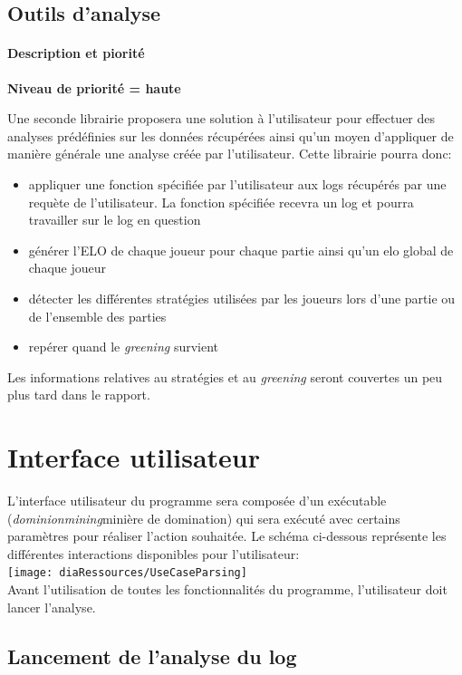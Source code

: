 \subsection{Outils d'analyse}

\paragraph*{Description et piorité}

\textbf{Niveau de priorité = haute}

Une seconde librairie proposera une solution à l'utilisateur pour effectuer des analyses prédéfinies sur les données récupérées ainsi qu'un moyen d'appliquer de manière générale une analyse créée par l'utilisateur. Cette librairie pourra donc:
\begin{itemize}
\item appliquer une fonction spécifiée par l'utilisateur aux logs récupérés par une requète de l'utilisateur. La fonction spécifiée recevra un log et pourra travailler sur le log en question
\item générer l'ELO de chaque joueur pour chaque partie ainsi qu'un elo global de chaque joueur
\item détecter les différentes stratégies utilisées par les joueurs lors d'une partie ou de l'ensemble des parties
\item repérer quand le \textit{greening} survient
\end{itemize}

Les informations relatives au stratégies et au \textit{greening} seront couvertes un peu plus tard dans le rapport.
\iffalse
\section{Interface utilisateur}
L'interface utilisateur du programme sera composée d'un exécutable (\textit{dominionmining}minière de domination) qui sera exécuté avec certains paramètres pour réaliser l'action souhaitée. Le schéma ci-dessous représente les différentes interactions disponibles pour l'utilisateur:\\

\texttt{[image: diaRessources/UseCaseParsing]}\\
Avant l'utilisation de toutes les fonctionnalités du programme, l'utilisateur doit lancer l'analyse.
\subsection{Lancement de l'analyse du log}
